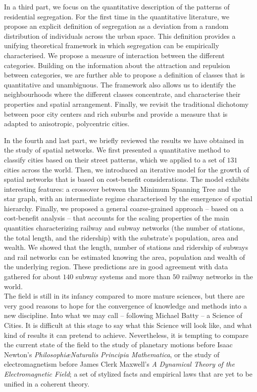 In a third part, we focus on the quantitative description of the patterns of
residential segregation. For the first time in the quantitative literature, we
propose an explicit definition of segregation as a deviation from a random
distribution of individuals across the urban space. This definition provides a
unifying theoretical framework in which segregation can be empirically
characterised. We propose a measure of interaction between the different
categories. Building on the information about the attraction and repulsion
between categories, we are further able to propose a definition of classes that
is quantitative and unambiguous. The framework also allows us to identify the
neighbourhoods where the different classes concentrate, and characterise their
properties and spatial arrangement. Finally, we revisit the traditional
dichotomy between poor city centers and rich suburbs and provide a measure that
is adapted to anisotropic, polycentric cities. 

In the fourth and last part, we briefly reviewed the results we have obtained in
the study of spatial networks. We first presented a quantitative method to
classify cities based on their street patterns, which we applied to a set of
$131$ cities across the world. Then, we introduced an iterative model for the
growth of spatial networks that is based on cost-benefit considerations. The
model exhibits interesting features: a crossover between the Minimum Spanning
Tree and the star graph, with an intermediate regime characterised by the
emergence of spatial hierarchy. Finally, we proposed a general coarse-grained
approach -- based on a
cost-benefit analysis -- that accounts for the scaling properties of the main
quantities characterizing railway and subway networks (the number of stations, the total
length, and the ridership) with the substrate's population, area and wealth.
We showed that the length, number of stations and ridership of
subways and rail networks can be estimated knowing the area, population and
wealth of the underlying region. These predictions are in good agreement with
data gathered for about $140$ subway systems and more than $50$ railway networks in the
world.\\ 

The field is still in its infancy compared to more mature sciences, but there
are very good reasons to hope for the convergence of knowledge and methods into
a new discipline. Into what we may call -- following Michael Batty -- a Science of
Cities. It is difficult at this stage to say what this Science will look like,
and what kind of results it can pretend to achieve. Nevertheless, it is tempting to
compare the current state of the field to the study of planetary motions
before Isaac Newton's \emph{Philosophi\ae Naturalis Principia Mathematica}, or
the study of electromagnetism before James Clerk Maxwell's \emph{A Dynamical
Theory of the Electromagnetic Field}; a set of stylized facts and empirical laws
that are yet to be unified in a coherent theory. 

